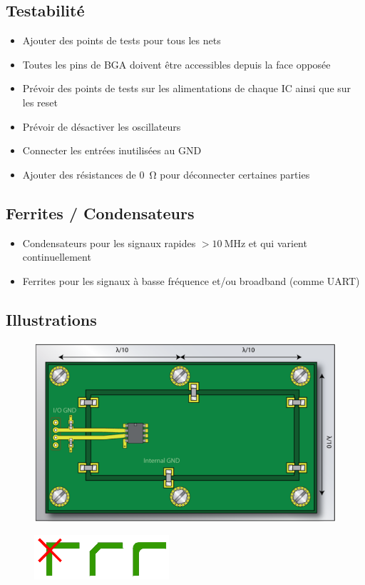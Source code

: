 \documentclass[resume]{subfiles}
\begin{document}
\begin{multicols}{3}
\subsection{Testabilité}
\begin{itemize}
\item Ajouter des points de tests pour tous les nets
\item Toutes les pins de BGA doivent être accessibles depuis la face opposée
\item Prévoir des points de tests sur les alimentations de chaque IC ainsi que sur les reset
\item Prévoir de désactiver les oscillateurs
\item Connecter les entrées inutilisées au GND
\item Ajouter des résistances de \SI{0}{\ohm} pour déconnecter certaines parties
\end{itemize}
\subsection{Ferrites / Condensateurs}
\begin{itemize}
\item Condensateurs pour les signaux rapides $>\SI{10}{\mega\hertz}$ et qui varient continuellement
\item Ferrites pour les signaux à basse fréquence et/ou broadband (comme UART)
\end{itemize}
\subsection{Illustrations}
\begin{figure}[H]
\centering
\includegraphics[width=0.9\columnwidth]{img_30.png}
\end{figure}
\begin{figure}[H]
\centering
\includegraphics[width=5.00cm]{img_83.png}
\end{figure}

\end{multicols}
\end{document}
